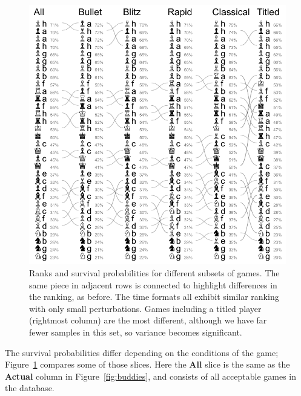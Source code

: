 \documentclass[twocolumn]{article}
\begin{document}
\begin{figure}
  \includegraphics[width=\linewidth]{slices}
  \caption{
    Ranks and survival probabilities for different subsets of games.
    The same piece in adjacent rows is connected to highlight
    differences in the ranking, as before. The time formats all
    exhibit similar ranking with only small perturbations. Games
    including a titled player (rightmost column) are the most
    different, although we have far fewer samples in this set,
    so variance becomes significant.
  } \label{fig:slices}
\end{figure}

The survival probabilities differ depending on the conditions of the
game; Figure~\ref{fig:slices} compares some of those slices. Here the
{\bf All} slice is the same as the {\bf Actual} column in
Figure~\ref{fig:buddies}, and consists of all acceptable games in the
database.
\end{document}
